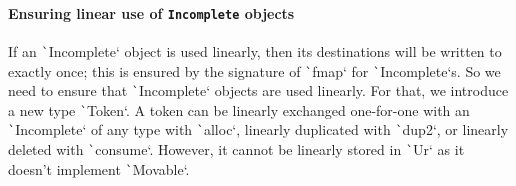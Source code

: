 \documentclass[english]{jflart}
\begin{document}



\paragraph{Ensuring linear use of \texttt{Incomplete} objects}

If an \texttt`Incomplete` object is used linearly, then its destinations will be written to exactly once; this is ensured by the signature of \texttt`fmap` for \texttt`Incomplete`s. So we need to ensure that \texttt`Incomplete` objects are used linearly. For that, we introduce a new type \texttt`Token`. A token can be linearly exchanged one-for-one with an \texttt`Incomplete` of any type with \texttt`alloc`, linearly duplicated with \texttt`dup2`, or linearly deleted with \texttt`consume`. However, it cannot be linearly stored in \texttt`Ur` as it doesn't implement \texttt`Movable`.
\end{document}
